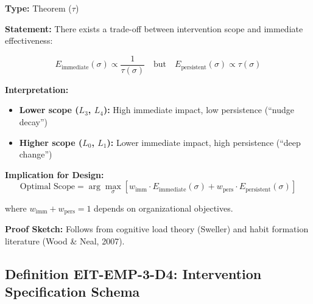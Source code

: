 \begin{tcolorbox}[colback=yellow!5!white, colframe=yellow!75!black,
    title=\textbf{Theorem EIT-T16: Scope-Persistence Trade-off}]

\textbf{Type:} Theorem ($\tau$)

\textbf{Statement:} There exists a trade-off between intervention scope and immediate effectiveness:

\begin{equation}
E_{\text{immediate}}(\sigma) \propto \frac{1}{\tau(\sigma)} \quad \text{but} \quad E_{\text{persistent}}(\sigma) \propto \tau(\sigma)
\end{equation}

\textbf{Interpretation:}
\begin{itemize}[nosep]
    \item \textbf{Lower scope ($L_3$, $L_4$):} High immediate impact, low persistence (``nudge decay'')
    \item \textbf{Higher scope ($L_0$, $L_1$):} Lower immediate impact, high persistence (``deep change'')
\end{itemize}

\textbf{Implication for Design:}
\begin{equation}
\text{Optimal Scope} = \arg\max_\sigma \left[ w_{\text{imm}} \cdot E_{\text{immediate}}(\sigma) + w_{\text{pers}} \cdot E_{\text{persistent}}(\sigma) \right]
\end{equation}

where $w_{\text{imm}} + w_{\text{pers}} = 1$ depends on organizational objectives.

\textbf{Proof Sketch:} Follows from cognitive load theory (Sweller) and habit formation literature (Wood \& Neal, 2007).

\end{tcolorbox}

\subsection{Definition EIT-EMP-3-D4: Intervention Specification Schema}
\label{subsec:intervention-spec}

